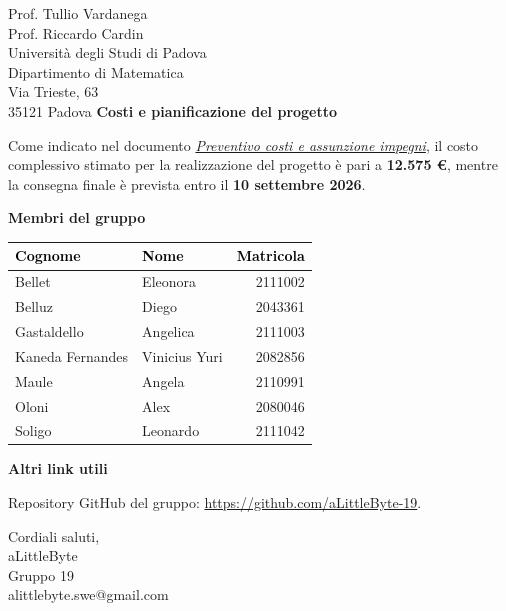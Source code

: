 \documentclass[a4paper,11pt]{letter}
\makeatletter
\newcommand{\GruppoFirma}{aLittleByte\\Gruppo 19\\alittlebyte.swe@gmail.com}
\makeatother
\begin{document}
\begin{letter}{Prof. Tullio Vardanega\\Prof. Riccardo Cardin\\Università degli Studi di Padova\\Dipartimento di Matematica\\Via Trieste, 63\\35121 Padova}
  \textbf{Costi e pianificazione del progetto}

  Come indicato nel documento \href{https://alittlebyte-19.github.io/Documentazione/candidatura/Dichiarazione%20Impegni/Preventivo%20costi%20e%20assunzione%20impegni.pdf}{\textit{Preventivo costi e assunzione impegni}},
  il costo complessivo stimato per la realizzazione del progetto è pari a
  \textbf{12.575 \euro{}}, mentre la consegna finale è prevista entro il
  \textbf{10 settembre 2026}.

  \vspace{1em}

  \textbf{Membri del gruppo}
  \begin{center}
  \setlength{\arrayrulewidth}{0.8pt}
  \begin{tabular}{|l|l|r|}
  \hline
  \rowcolor{primarycolor!20}
  \textcolor{black}{\textbf{Cognome}} & \textcolor{black}{\textbf{Nome}} & \textcolor{black}{\textbf{Matricola}} \\
  \hline
  Bellet & Eleonora & 2111002\\
  \hline
  Belluz & Diego & 2043361\\
  \hline
  Gastaldello & Angelica & 2111003\\
  \hline
  Kaneda Fernandes & Vinicius Yuri & 2082856 \\
  \hline
  Maule & Angela & 2110991\\
  \hline
  Oloni & Alex & 2080046\\
  \hline
  Soligo & Leonardo & 2111042\\
  \hline
  \end{tabular}
  \end{center}

  \vspace{0.8em}

  \textbf{Altri link utili}

  Repository GitHub del gruppo: \href{https://github.com/aLittleByte-19}{https://github.com/aLittleByte-19}.

  \vspace{1.2em}

  \closing{Cordiali saluti, \vspace{1.2em} \\ \GruppoFirma}

  \end{letter}

  
\end{document}
